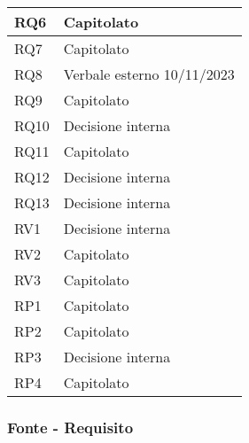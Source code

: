 \begin{center}
\begin{longtable}{|C{5cm}|C{5cm}|}
        \hline
        RQ6 & Capitolato \\
        \hline
        RQ7 & Capitolato \\
        \hline
        RQ8 & Verbale esterno 10/11/2023 \\
        \hline
        RQ9 & Capitolato \\
        \hline
        RQ10 & Decisione interna \\
        \hline
        RQ11 & Capitolato \\
        \hline
        RQ12 & Decisione interna \\
        \hline
        RQ13 & Decisione interna \\
        \hline
        \hline
        RV1 & Decisione interna \\
        \hline
        RV2 & Capitolato \\
        \hline
        RV3 & Capitolato \\
        \hline
        \hline
        RP1 & Capitolato \\
        \hline
        RP2 & Capitolato \\
        \hline
        RP3 & Decisione interna \\
        \hline
        RP4 & Capitolato \\
        \hline
    \end{longtable}
\end{center}

\subsubsection{Fonte - Requisito}

